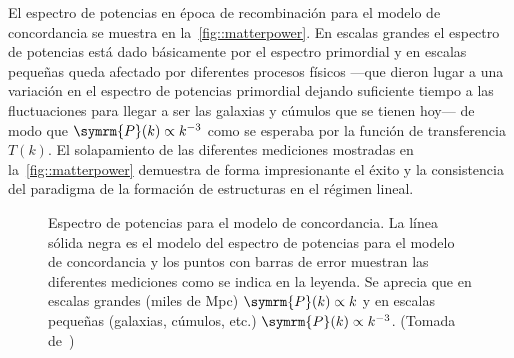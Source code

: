 El espectro de potencias en época de recombinación para el modelo de concordancia se muestra en la~\autoref{fig::matterpower}. En escalas grandes el espectro de potencias está dado básicamente por el espectro primordial y en escalas pequeñas queda afectado por diferentes procesos físicos ---que dieron lugar a una variación en el espectro de potencias primordial dejando suficiente tiempo a las fluctuaciones para llegar a ser las galaxias y cúmulos que se tienen hoy--- de modo que \(\symrm{P}(k)\propto k^{-3}\) como se esperaba por la función de transferencia \(T(k)\). El solapamiento de las diferentes mediciones mostradas en la~\autoref{fig::matterpower} demuestra de forma impresionante el éxito y la consistencia del paradigma de la formación de estructuras en el régimen lineal.
\begin{figure}[h]
    \centering
    \def\svgwidth{0.95\textwidth}
    
    \caption[Espectro de potencias para el modelo de concordancia]{Espectro de potencias para el modelo de concordancia. La línea sólida negra es el modelo del espectro de potencias para el modelo de concordancia y los puntos con barras de error muestran las diferentes mediciones como se indica en la leyenda. Se aprecia que en escalas grandes (miles de Mpc) \(\symrm{P}(k)\propto k\) y en escalas pequeñas (galaxias, cúmulos, etc.) \(\symrm{P}(k)\propto k^{-3}\). (Tomada de~\cite{collaboration2020planck1})}
    \label{fig::matterpower}
\end{figure}